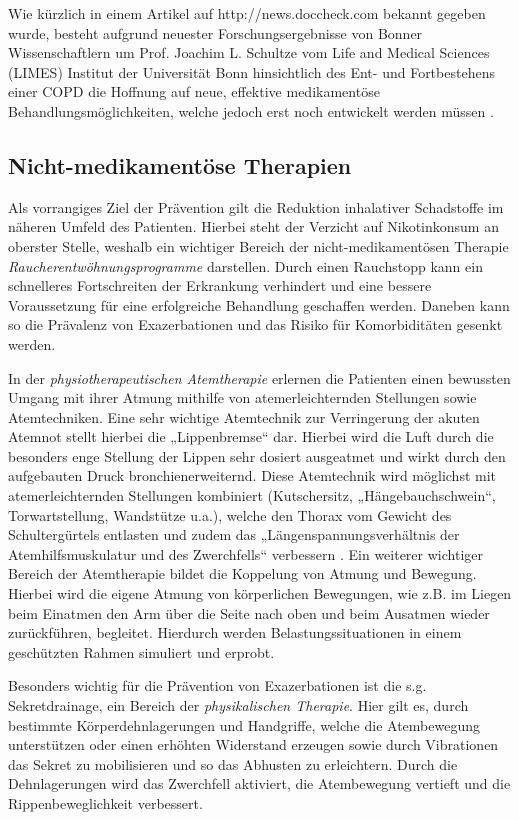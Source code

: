 Wie kürzlich in einem Artikel auf http://news.doccheck.com bekannt gegeben wurde, besteht aufgrund neuester Forschungsergebnisse von Bonner Wissenschaftlern um Prof. Joachim L. Schultze vom Life and Medical Sciences (LIMES) Institut der Universität Bonn hinsichtlich des Ent- und Fortbestehens einer COPD die Hoffnung auf neue, effektive medikamentöse Behandlungsmöglichkeiten, welche jedoch erst noch entwickelt werden müssen \autocite[vgl.]{doccheck2014}.

\subsection{Nicht-medikamentöse Therapien}
\label{nicht-medikamentoese_therapien}
Als vorrangiges Ziel der Prävention gilt die Reduktion inhalativer Schadstoffe im näheren Umfeld des Patienten. Hierbei steht der Verzicht auf Nikotinkonsum an oberster Stelle, weshalb ein wichtiger Bereich der nicht-medikamentösen Therapie \emph{Raucherentwöhnungsprogramme} darstellen. Durch einen Rauchstopp kann ein schnelleres Fortschreiten der Erkrankung verhindert und eine bessere Voraussetzung für eine erfolgreiche Behandlung geschaffen werden. Daneben kann so die Prävalenz von Exazerbationen und das Risiko für Komorbiditäten gesenkt werden.

In der \emph{physiotherapeutischen Atemtherapie} erlernen die Patienten einen bewussten Umgang mit ihrer Atmung mithilfe von atemerleichternden Stellungen sowie Atemtechniken. Eine sehr wichtige Atemtechnik zur Verringerung der akuten Atemnot stellt hierbei die „Lippenbremse“ dar. Hierbei wird die Luft durch die besonders enge Stellung der Lippen sehr dosiert ausgeatmet und wirkt durch den aufgebauten Druck bronchienerweiternd. Diese Atemtechnik wird möglichst mit atemerleichternden Stellungen kombiniert (Kutschersitz, „Hängebauchschwein“, Torwartstellung, Wandstütze u.a.), welche den Thorax vom Gewicht des Schultergürtels entlasten und zudem das „Längenspannungsverhältnis der Atemhilfsmuskulatur und des Zwerchfells“ verbessern \autocite[vgl.][291]{lang2007}. Ein weiterer wichtiger Bereich der Atemtherapie bildet die Koppelung von Atmung und Bewegung. Hierbei wird die eigene Atmung von körperlichen Bewegungen, wie z.B. im Liegen beim Einatmen den Arm über die Seite nach oben und beim Ausatmen wieder zurückführen, begleitet. Hierdurch werden Belastungssituationen in einem geschützten Rahmen simuliert und erprobt.

Besonders wichtig für die Prävention von Exazerbationen ist die s.g. Sekretdrainage, ein Bereich der \emph{physikalischen Therapie}. Hier gilt es, durch bestimmte Körperdehnlagerungen und Handgriffe, welche die Atembewegung unterstützen oder einen erhöhten Widerstand erzeugen sowie durch Vibrationen das Sekret zu mobilisieren und so das Abhusten zu erleichtern. Durch die Dehnlagerungen wird das Zwerchfell aktiviert, die Atembewegung vertieft und die Rippenbeweglichkeit verbessert.

